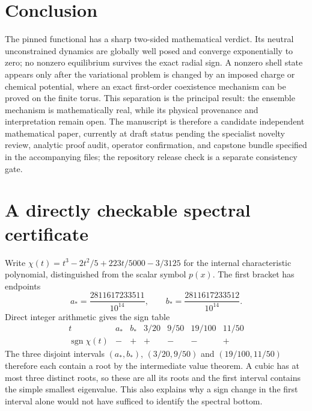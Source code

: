 \documentclass[11pt]{article}
\numberwithin{equation}{section}
\theoremstyle{definition}
\begin{document}
\section{Conclusion}

The pinned functional has a sharp two-sided mathematical verdict.  Its neutral
unconstrained dynamics are globally well posed and converge exponentially to
zero; no nonzero equilibrium survives the exact radial sign.  A nonzero shell
state appears only after the variational problem is changed by an imposed
charge or chemical potential, where an exact first-order coexistence mechanism
can be proved on the finite torus.  This separation is the principal result:
the ensemble mechanism is mathematically real, while its physical provenance
and interpretation remain open.  The manuscript is therefore a candidate
independent mathematical paper, currently at draft status pending the specialist novelty review, analytic proof
audit, operator confirmation, and capstone bundle specified in the accompanying
files; the repository release check is a separate consistency gate.

\appendix
\section{A directly checkable spectral certificate}
\label{sec:exact-spectral-certificate}

Write $\chi(t)=t^3-2t^2/5+223t/5000-3/3125$ for the internal
characteristic polynomial, distinguished from the scalar symbol $p(x)$.
The first bracket has endpoints
\[
 a_*=\frac{2811617233511}{10^{14}},\qquad
 b_*=\frac{2811617233512}{10^{14}}.
\]
Direct integer arithmetic gives the sign table
\begin{equation}
\begin{array}{c|rrrrrr}
t&a_*&b_*&3/20&9/50&19/100&11/50\\ \hline
\operatorname{sgn}\chi(t)&-&+&+&-&-&+
\end{array}
\label{eq:root-sign-certificate}
\end{equation}
The three disjoint intervals $(a_*,b_*)$, $(3/20,9/50)$ and
$(19/100,11/50)$ therefore each contain a root by the intermediate value
theorem.  A cubic has at most three distinct roots, so these are all its
roots and the first interval contains the simple smallest eigenvalue.
This also explains why a sign change in the first interval alone would
not have sufficed to identify the spectral bottom.
\end{document}
